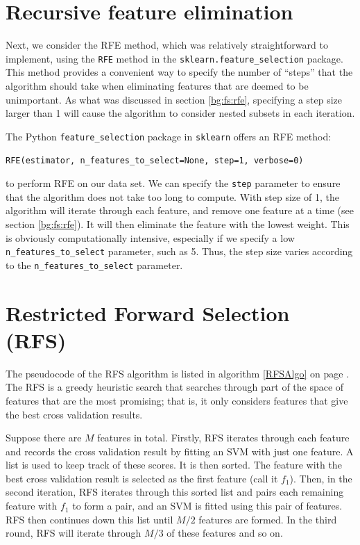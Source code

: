 \documentclass[12pt, twoside, a4paper]{report}
\begin{document}
\section{Recursive feature elimination} \label{body:rfe}

Next, we consider the RFE method, which was relatively straightforward to implement, using the \texttt{RFE} method in the \texttt{sklearn.feature\_selection} package. This method provides a convenient way to specify the number of ``steps'' that the algorithm should take when eliminating features that are deemed to be unimportant. As what was discussed in section \ref{bg:fs:rfe}, specifying a step size larger than 1 will cause the algorithm to consider nested subsets in each iteration.

The Python \texttt{feature\_selection} package in \texttt{sklearn} offers an RFE method:
\begin{center}
\texttt{RFE(estimator, n\_features\_to\_select=None, step=1, verbose=0)}
\end{center}

to perform RFE on our data set. We can specify the \texttt{step} parameter to ensure that the algorithm does not take too long to compute. With step size of 1, the algorithm will iterate through each feature, and remove one feature at a time (see section \ref{bg:fs:rfe}). It will then eliminate the feature with the lowest weight. This is obviously computationally intensive, especially if we specify a low \texttt{n\_features\_to\_select} parameter, such as 5. Thus, the step size varies according to the \texttt{n\_features\_to\_select} parameter.

\section{Restricted Forward Selection (RFS)} \label{body:rfs}

The pseudocode of the RFS algorithm \cite{deng1998omega} is listed in algorithm \ref{RFSAlgo} on page \pageref{RFSAlgo}. The RFS is a greedy heuristic search that searches through part of the space of features that are the most promising; that is, it only considers features that give the best cross validation results.

Suppose there are $M$ features in total. Firstly, RFS iterates through each feature and records the cross validation result by fitting an SVM with just one feature. A list is used to keep track of these scores. It is then sorted. The feature with the best cross validation result is selected as the first feature (call it $f_1$). Then, in the second iteration, RFS iterates through this sorted list and pairs each remaining feature with $f_1$ to form a pair, and an SVM is fitted using this pair of features. RFS then continues down this list until $M/2$ features are formed. In the third round, RFS will iterate through $M/3$ of these features and so on.
\end{document}
